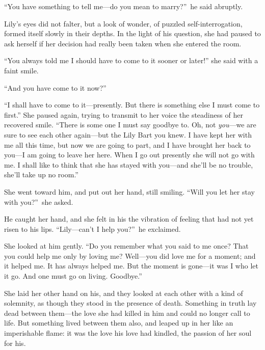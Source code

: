 \documentclass[12pt,a4paper]{book}
\begin{document}
``You have something to tell me---do you mean to marry?''\ he said
abruptly.





Lily's eyes did not falter, but a look of wonder, of puzzled
self-interrogation, formed itself slowly in their depths. In the
light of his question, she had paused to ask herself if her
decision had really been taken when she entered the room.





``You always told me I should have to come to it sooner or later!''
she said with a faint smile.





``And you have come to it now?''





``I shall have to come to it---presently. But there is something
else I must come to first.'' She paused again, trying to transmit
to her voice the steadiness of her recovered smile. ``There is
some one I must say goodbye to. Oh, not \textit{you}---we are sure to see
each other again---but the Lily Bart you knew. I have kept her
with me all this time, but now we are going to part, and I have
brought her back to you---I am going to leave her here. When I go
out presently she will not go with me. I shall like to think that
she has stayed with you---and she'll be no trouble, she'll take up
no room.''





She went toward him, and put out her hand, still smiling. ``Will
you let her stay with you?''\ she asked.





He caught her hand, and she felt in his the vibration of feeling
that had not yet risen to his lips. ``Lily---can't I help you?''\ he
exclaimed.





She looked at him gently. ``Do you remember what you said to me
once? That you could help me only by loving me? Well---you did
love me for a moment; and it helped me. It has always
helped me. But the moment is gone---it was I who let it go. And
one must go on living. Goodbye.''





She laid her other hand on his, and they looked at each other
with a kind of solemnity, as though they stood in the presence of
death. Something in truth lay dead between them---the love she had
killed in him and could no longer call to life. But something
lived between them also, and leaped up in her like an
imperishable flame: it was the love his love had kindled, the
passion of her soul for his.
\end{document}
